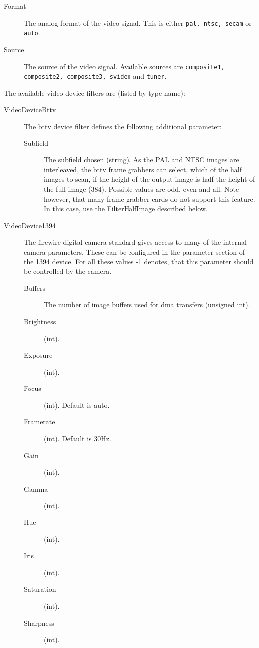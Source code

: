 \begin{description}
\item[Format] The analog format of the video signal. This is either
  \texttt{pal, ntsc, secam} or \texttt{auto}.
\item[Source] The source of the video signal. Available sources are
  \texttt{composite1, composite2, composite3, svideo} and
  \texttt{tuner}.
\end{description}



The available video device filters are (listed by type name):

\begin{description}
\item[VideoDeviceBttv] The bttv device filter defines the following
  additional parameter:
  \begin{description}
  \item[Subfield] The subfield chosen (string). As the PAL and
    NTSC images are interleaved, the bttv frame grabbers can select,
    which of the half images to scan, if the height of the output
    image is half the height of the full image (384). Possible values
    are odd, even and all. Note however, that many frame grabber cards
    do not support this feature. In this case, use the FilterHalfImage
    described below.
  \end{description}
\item[VideoDevice1394] The firewire digital camera standard gives
  access to many of the internal camera parameters. These can be
  configured in the parameter section of the 1394 device. For all
  these values -1 denotes, that this parameter should be controlled by
  the camera.
  \begin{description}
  \item[Buffers] The number of image buffers used for dma transfers
    (unsigned int).
  \item[Brightness] (int).
  \item[Exposure] (int).
  \item[Focus] (int). Default is auto.
  \item[Framerate] (int). Default is 30Hz.
  \item[Gain] (int).
  \item[Gamma] (int).
  \item[Hue] (int).
  \item[Iris] (int).
  \item[Saturation] (int).
  \item[Sharpness] (int).

\end{description}
\end{description}
